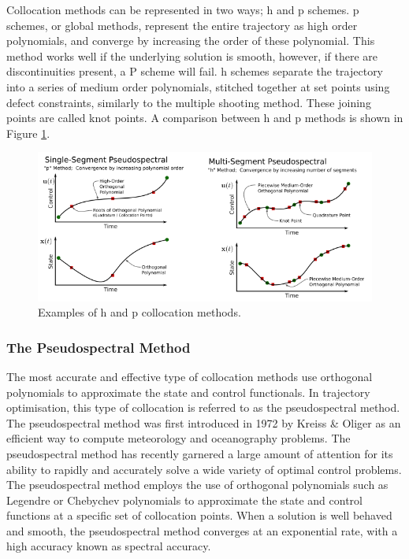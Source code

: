 Collocation methods can be represented in two ways; h and p schemes\cite{Kelly2015}. p schemes, or global methods, represent the entire trajectory as high order polynomials, and converge by increasing the order of these polynomial\cite{Kelly2015}. This method works well if the underlying solution is smooth, however, if there are discontinuities present, a P scheme will fail\cite{Kelly2015}. h schemes separate the trajectory into a series of medium order polynomials, stitched together at set points using defect constraints, similarly to the multiple shooting method\cite{Kelly2015,Rao2009,Ross2004}. These joining points are called knot points\cite{Kelly2015,Ross2004}. A comparison between h and p methods is shown in Figure \ref{fig:HPExamples}.

\begin{figure}[ht]
	\centering
	\includegraphics[width=0.9\linewidth]{figures/2_literature-review/HPExamples}
	\caption{Examples of h and p collocation methods\cite{Kelly2015}.}
	\label{fig:HPExamples}
\end{figure}

\subsubsection{The Pseudospectral Method}\label{sec:PS}


The most accurate and effective type of collocation methods use orthogonal polynomials to approximate the state and control functionals\cite{Fahroo2000}. In trajectory optimisation, this type of collocation is referred to as the pseudospectral method\cite{Kelly2015}. 
The pseudospectral method was first introduced in 1972 by Kreiss \& Oliger \cite{Kreiss1972} as an efficient way to compute meteorology and oceanography problems. The pseudospectral method has recently garnered a large amount of attention for its ability to rapidly and accurately solve a wide variety of optimal control problems. The pseudospectral method employs the use of orthogonal polynomials such as Legendre or Chebychev polynomials to approximate the state and control functions at a specific set of collocation points\cite{Fahroo2000,Huntington2007,Kelly2015,Rao2009}.
 When a solution is well behaved and smooth, the pseudospectral method converges at an exponential rate, with a high accuracy known as spectral accuracy\cite{Ross2004,Darby2011a}. 
 

